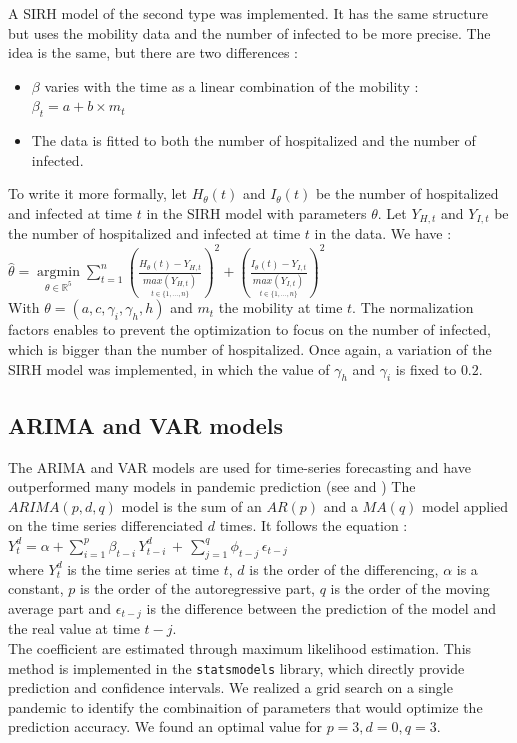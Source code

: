 A SIRH model of the second type was implemented. 
It has the same structure but uses the mobility data and the number of infected to be more precise. 
The idea is the same, but there are two differences : 
\begin{itemize}
    \item $\beta$ varies with the time as a linear combination of the mobility : $\beta_t = a + b \times m_t$ 
    \item The data is fitted to both the number of hospitalized and the number of infected. 
\end{itemize}
To write it more formally, let $H_\theta(t)$ and $I_\theta(t)$ be the number of hospitalized and infected at time $t$ in the SIRH model with parameters $\theta$.
Let $Y_{H, t}$ and $Y_{I, t}$ be the number of hospitalized and infected at time $t$ in the data.
We have :\\

$\hat{\theta} = \underset{\theta \in \mathbb{R}^5}{\operatorname{argmin}} \sum_{t=1}^{n} (\frac{H_\theta(t) - Y_{H, t}}{\underset{t \in \{1, ..., n \}}{max(Y_{H, t})}})^2 + (\frac{I_\theta(t) - Y_{I, t}}{\underset{t \in \{1, ..., n \}}{max(Y_{I, t})}})^2$\\

With $\theta = (a, c, \gamma_i, \gamma_h, h)$ and $m_t$ the mobility at time $t$.
The normalization factors enables to prevent the optimization to focus on the number of infected, which is bigger than the number of hospitalized. 
Once again, a variation of the SIRH model was implemented, in which the value of $\gamma_h$ and $\gamma_i$ is fixed to $0.2$. 



\subsection*{ARIMA and VAR models} 

The ARIMA and VAR models are used for time-series forecasting and have outperformed many models in pandemic prediction (see \cite[text]{kufel2020arima} and \cite[text]{shang2021regional})
The $ARIMA(p, d, q)$ model is the sum of an $AR(p)$ and a $MA(q)$ model applied on the time series differenciated $d$ times. 
It follows the equation : \\
$Y_{t}^{d}=\alpha+\sum_{i=1}^{p}\beta_{t-i}\,Y_{t-i}^{d}\,+\,\sum_{j=1}^{q}\phi_{t-j}\,\epsilon_{t-j}$\\
where $Y_{t}^{d}$ is the time series at time $t$, $d$ is the order of the differencing, $\alpha$ is a constant, $p$ is the order of the autoregressive part, $q$ is the order of the moving average part and $\epsilon_{t-j}$ is the difference between the prediction of the model and the real value at time $t-j$.\\
The coefficient are estimated through maximum likelihood estimation. 
This method is implemented in the \texttt{statsmodels} library, which directly provide prediction and confidence intervals.
We realized a grid search on a single pandemic to identify the combinaition of parameters that would optimize the prediction accuracy. 
We found an optimal value for $p= 3, d=0, q=3$. 

